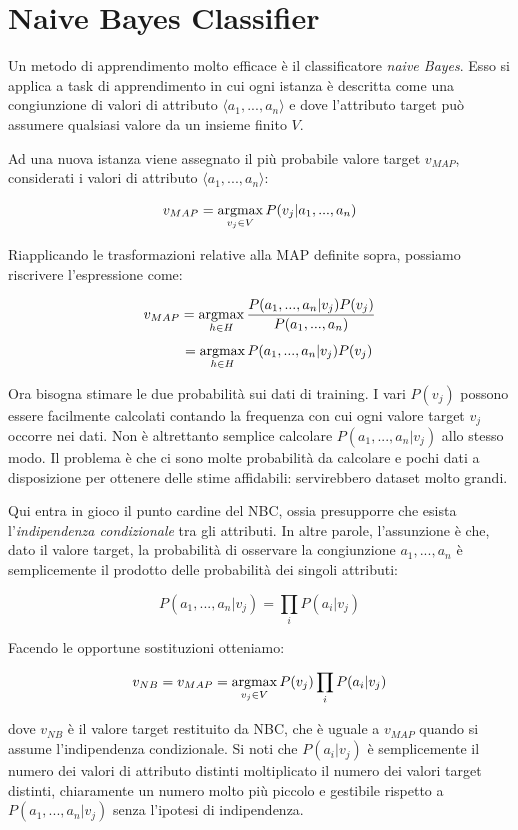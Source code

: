 \section{Naive Bayes Classifier}
Un metodo di apprendimento molto efficace è il classificatore \emph{naive Bayes}. Esso si applica a task di apprendimento in cui ogni istanza è descritta come una congiunzione di valori di attributo $\langle a_1, ..., a_n \rangle$ e dove l'attributo target può assumere qualsiasi valore da un insieme finito $V$.

Ad una nuova istanza viene assegnato il più probabile valore target $v_{MAP}$, considerati i valori di attributo $\langle a_1, ..., a_n \rangle$:

$$ v_{MAP} = \operatorname*{argmax}_{v_j \in V} P(v_j | a_1, ..., a_n) $$

Riapplicando le trasformazioni relative alla MAP definite sopra, possiamo riscrivere l'espressione come:

$$v_{MAP} = \operatorname*{argmax}_{h \in H} \frac{P(a_1, ..., a_n | v_j) P(v_j)}{P(a_1, ..., a_n)} $$
$$\hphantom{11111} = \operatorname*{argmax}_{h \in H} P(a_1, ..., a_n | v_j) P(v_j) $$

Ora bisogna stimare le due probabilità sui dati di training. I vari $P(v_j)$ possono essere facilmente calcolati contando la frequenza con cui ogni valore target $v_j$ occorre nei dati. Non è altrettanto semplice calcolare $P(a_1, ..., a_n | v_j)$ allo stesso modo. Il problema è che ci sono molte probabilità da calcolare e pochi dati a disposizione per ottenere delle stime affidabili: servirebbero dataset molto grandi.

Qui entra in gioco il punto cardine del NBC, ossia presupporre che esista l'\emph{indipendenza condizionale} tra gli attributi. In altre parole, l'assunzione è che, dato il valore target, la probabilità di osservare la congiunzione $a_1, ..., a_n$ è semplicemente il prodotto delle probabilità dei singoli attributi:

$$ P(a_1, ..., a_n | v_j) = \prod_i P(a_i|v_j) $$

\noindent
Facendo le opportune sostituzioni otteniamo:

$$ v_{NB} = v_{MAP} = \operatorname*{argmax}_{v_j \in V} P(v_j) \prod_i P(a_i|v_j) $$

dove $v_{NB}$ è il valore target restituito da NBC, che è uguale a $v_{MAP}$ quando si assume l'indipendenza condizionale. Si noti che $P(a_i|v_j)$ è semplicemente il numero dei valori di attributo distinti moltiplicato il numero dei valori target distinti, chiaramente un numero molto più piccolo e gestibile rispetto a $P(a_1, ..., a_n | v_j)$ senza l'ipotesi di indipendenza. 

